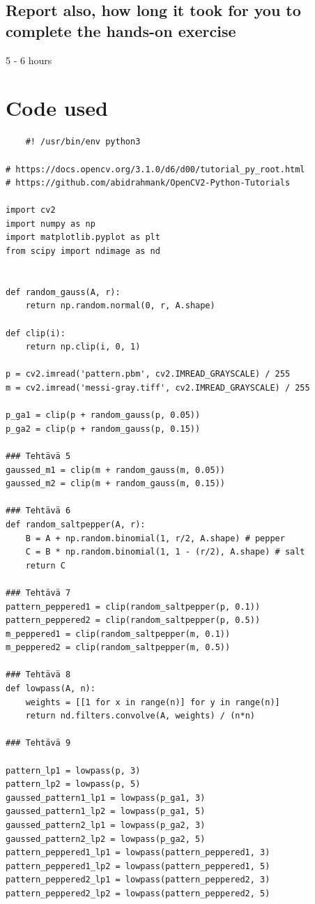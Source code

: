 \documentclass{article}
\begin{document}
 \subsection{Report also, how long it took for you to complete the hands-on exercise}
    5 - 6 hours

    \section{Code used}
\begin{verbatim}
    #! /usr/bin/env python3

# https://docs.opencv.org/3.1.0/d6/d00/tutorial_py_root.html
# https://github.com/abidrahmank/OpenCV2-Python-Tutorials

import cv2
import numpy as np
import matplotlib.pyplot as plt
from scipy import ndimage as nd


def random_gauss(A, r):
    return np.random.normal(0, r, A.shape)

def clip(i):
    return np.clip(i, 0, 1)

p = cv2.imread('pattern.pbm', cv2.IMREAD_GRAYSCALE) / 255
m = cv2.imread('messi-gray.tiff', cv2.IMREAD_GRAYSCALE) / 255

p_ga1 = clip(p + random_gauss(p, 0.05))
p_ga2 = clip(p + random_gauss(p, 0.15))

### Tehtävä 5
gaussed_m1 = clip(m + random_gauss(m, 0.05))
gaussed_m2 = clip(m + random_gauss(m, 0.15))

### Tehtävä 6
def random_saltpepper(A, r):
    B = A + np.random.binomial(1, r/2, A.shape) # pepper
    C = B * np.random.binomial(1, 1 - (r/2), A.shape) # salt
    return C

### Tehtävä 7
pattern_peppered1 = clip(random_saltpepper(p, 0.1))
pattern_peppered2 = clip(random_saltpepper(p, 0.5))
m_peppered1 = clip(random_saltpepper(m, 0.1))
m_peppered2 = clip(random_saltpepper(m, 0.5))

### Tehtävä 8
def lowpass(A, n):
    weights = [[1 for x in range(n)] for y in range(n)]
    return nd.filters.convolve(A, weights) / (n*n)

### Tehtävä 9

pattern_lp1 = lowpass(p, 3)
pattern_lp2 = lowpass(p, 5)
gaussed_pattern1_lp1 = lowpass(p_ga1, 3)
gaussed_pattern1_lp2 = lowpass(p_ga1, 5)
gaussed_pattern2_lp1 = lowpass(p_ga2, 3)
gaussed_pattern2_lp2 = lowpass(p_ga2, 5)
pattern_peppered1_lp1 = lowpass(pattern_peppered1, 3) 
pattern_peppered1_lp2 = lowpass(pattern_peppered1, 5) 
pattern_peppered2_lp1 = lowpass(pattern_peppered2, 3) 
pattern_peppered2_lp2 = lowpass(pattern_peppered2, 5) 



\end{verbatim}
\end{document}
